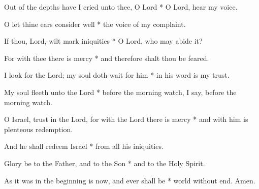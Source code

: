 Out of the depths have I cried unto thee, O Lord * O Lord, hear my voice.

O let thine ears consider well * the voice of my complaint.
	
If thou, Lord, wilt mark iniquities * O Lord, who may abide it?
	
For with thee there is mercy  * and therefore shalt thou be feared.
	
I look for the Lord; my soul doth wait for him * in his word is my trust.
	
My soul fleeth unto the Lord * before the morning watch, I say, before the morning watch.
	
O Israel, trust in the Lord, for with the Lord there is mercy * and with him is plenteous redemption.
	
And he shall redeem Israel * from all his iniquities.
	
Glory be to the Father, and to the Son * and to the Holy Spirit.
	
As it was in the beginning is now, and ever shall be * world without end. Amen.